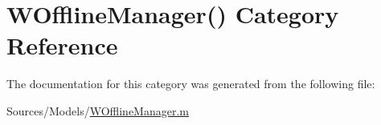 \hypertarget{category_w_offline_manager_07_08}{\section{W\-Offline\-Manager() Category Reference}
\label{category_w_offline_manager_07_08}
}


The documentation for this category was generated from the following file\-:\begin{DoxyCompactItemize}
\item 
Sources/\-Models/\hyperlink{_w_offline_manager_8m}{W\-Offline\-Manager.\-m}\end{DoxyCompactItemize}
